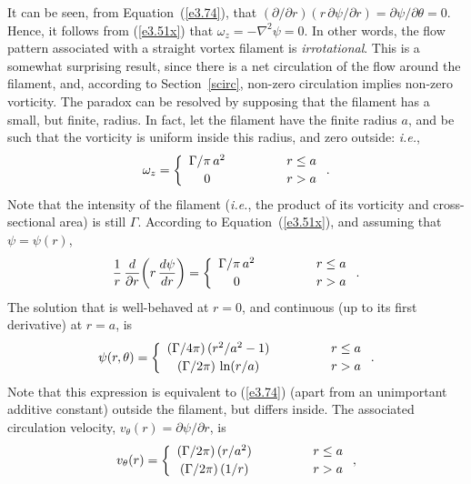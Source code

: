 It can be seen, from Equation~(\ref{e3.74}), that $(\partial/\partial r)(r\,\partial\psi/\partial r)= \partial\psi/\partial\theta=0$. 
Hence,
it follows from  (\ref{e3.51x}) that $\omega_z=-\nabla^2\psi=0$. In other words, the  flow pattern
associated with a straight vortex filament is {\em irrotational}. This is a somewhat surprising result, since there
is a net circulation of the flow around the filament, and, according to Section~\ref{scirc}, non-zero circulation implies
non-zero vorticity. The paradox can be resolved by supposing that the filament has a small,
but finite, radius. In fact, let the filament have the finite radius $a$, and be such that the vorticity is
uniform inside this radius, and zero outside: {\em i.e.}, 
\begin{eqnarray}
\omega_z = \left\{\begin{array}{ccc}
\Gamma/\pi\,a^2&\mbox{\hspace{1cm}}&r\leq a\\[0.5ex]
0&&r>a
\end{array}\right..
\end{eqnarray}
Note that the intensity of the filament ({\em i.e.}, the product of its vorticity and cross-sectional
area) is still $\Gamma$. According to Equation~(\ref{e3.51x}), and assuming that $\psi=\psi(r)$, 
\begin{eqnarray}
\frac{1}{r}\,\frac{d}{\partial r}\!\left(r\,\frac{d\psi}{d r}\right)= \left\{\begin{array}{ccc}
\Gamma/\pi\,a^2&\mbox{\hspace{1cm}}&r\leq a\\[0.5ex]
0&&r>a
\end{array}\right..
\end{eqnarray}
The solution that is well-behaved at $r=0$, and continuous (up to its first derivative) at $r=a$,  is
\begin{eqnarray}
\psi(r,\theta)= \left\{\begin{array}{ccc}
(\Gamma/4\pi)\,(r^2/a^2-1)&\mbox{\hspace{1cm}}&r\leq a\\[0.5ex]
(\Gamma/2\pi)\,\ln(r/a)&&r>a
\end{array}\right..
\end{eqnarray}
Note that this expression is equivalent to (\ref{e3.74}) (apart from an unimportant additive constant) outside the filament, but
 differs inside. The associated circulation velocity, $v_\theta(r)=\partial\psi/\partial r$, is
\begin{eqnarray}
v_\theta(r)= \left\{\begin{array}{ccc}
(\Gamma/2\pi)\,(r/a^2)&\mbox{\hspace{1cm}}&r\leq a\\[0.5ex]
(\Gamma/2\pi)\,(1/r)&&r>a
\end{array}\right.,
\end{eqnarray}
